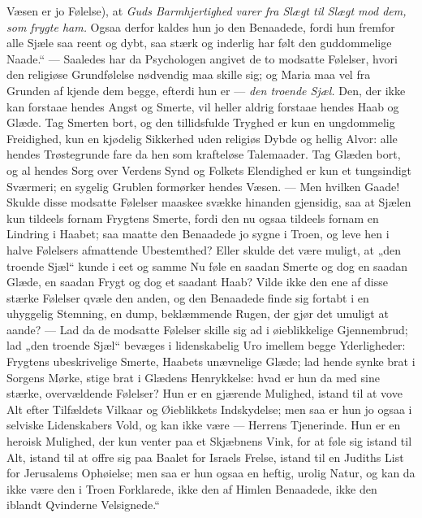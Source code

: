 \documentclass[12pt,a4paper]{book}
\begin{document}
Væsen er jo Følelse), at \emph{Guds Barmhjertighed varer fra Slægt til Slægt mod
dem, som frygte ham.} Ogsaa derfor kaldes hun jo den Benaadede, fordi hun
fremfor alle Sjæle saa reent og dybt, saa stærk og inderlig har følt den
guddommelige Naade.“ --- Saaledes har da Psychologen angivet de to modsatte
Følelser, hvori den religiøse Grundfølelse nødvendig maa skille sig; og Maria
maa vel fra Grunden af kjende dem begge, efterdi hun er --- \emph{den troende
Sjæl.} Den, der ikke kan forstaae hendes Angst og Smerte, vil heller aldrig
forstaae hendes Haab og Glæde. Tag Smerten bort, og den tillidsfulde Tryghed er
kun en ungdommelig Freidighed, kun en kjødelig Sikkerhed uden religiøs Dybde og
hellig Alvor: alle hendes Trøstegrunde fare da hen som krafteløse Talemaader.
Tag Glæden bort, og al hendes Sorg over Verdens Synd og Folkets Elendighed er
kun et tungsindigt Sværmeri; en sygelig Grublen formørker hendes Væsen. --- Men
hvilken Gaade! Skulde disse modsatte Følelser maaskee svække hinanden gjensidig,
saa at Sjælen kun tildeels fornam Frygtens Smerte, fordi den nu ogsaa tildeels
fornam en Lindring i Haabet; saa maatte den Benaadede jo sygne i Troen, og leve
hen i halve Følelsers afmattende Ubestemthed? Eller skulde det være muligt, at
„den troende Sjæl“ kunde i eet og samme Nu føle en saadan Smerte og dog en
saadan Glæde, en saadan Frygt og dog et saadant Haab? Vilde ikke den ene af
disse stærke Følelser qvæle den anden, og den Benaadede finde sig fortabt i en
uhyggelig Stemning, en dump, beklæmmende Rugen, der gjør det umuligt at aande?
--- Lad da de modsatte Følelser skille sig ad i øieblikkelige Gjennembrud; lad
„den troende Sjæl“ bevæges i lidenskabelig Uro imellem begge Yderligheder:
Frygtens ubeskrivelige Smerte, Haabets unævnelige Glæde; lad hende synke brat i
Sorgens Mørke, stige brat i Glædens Henrykkelse: hvad er hun da med sine stærke,
overvældende Følelser? Hun er en gjærende Mulighed, istand til at vove Alt efter
Tilfældets Vilkaar og Øieblikkets Indskydelse; men saa er hun jo ogsaa i selviske
Lidenskabers Vold, og kan ikke være --- Herrens Tjenerinde. Hun er en heroisk
Mulighed, der kun venter paa et Skjæbnens Vink, for at føle sig istand til Alt,
istand til at offre sig paa Baalet for Israels Frelse, istand til en Judiths
List for Jerusalems Ophøielse; men saa er hun ogsaa en heftig,
urolig Natur, og kan da ikke være den i Troen Forklarede, ikke den af Himlen
Benaadede, ikke den iblandt Qvinderne Velsignede.“
\end{document}

